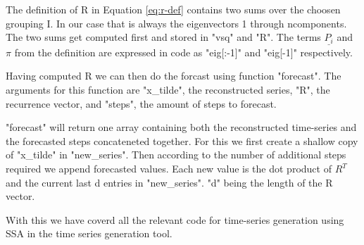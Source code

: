 The definition of R in Equation \eqref{eq:r-def} contains two sums over the choosen grouping I. In our case that is always the eigenvectors 1 through ncomponents. The two sums get computed first and stored in "vsq" and "R". The terms  $\underline{P_i}$ and $\pi$ from the definition are expressed in code as "eig[:-1]" and "eig[-1]" respectively. 

Having computed R we can then do the forcast using function "forecast". The arguments for this function are "x\_tilde", the reconstructed series, "R", the recurrence vector, and "steps", the amount of steps to forecast. 

"forecast" will return one array containing both the reconstructed time-series and the forecasted steps concateneted together. For this we first create a shallow copy of "x\_tilde" in "new\_series". Then according to the number of additional steps required we append forecasted values. Each new value is the dot product of $R^T$ and the current last d entries in "new\_series". "d" being the length of the R vector. 

With this we have coverd all the relevant code for time-series generation using SSA in the time series generation tool. 